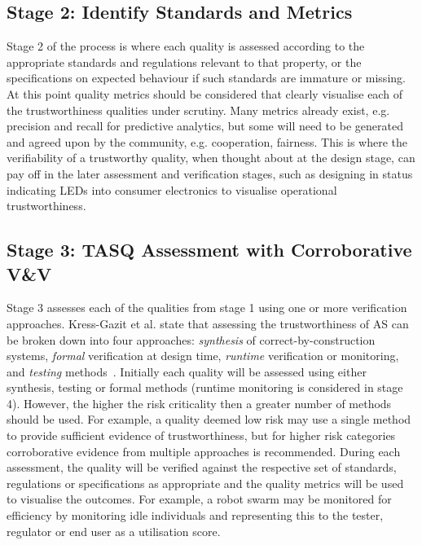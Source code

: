 \subsection{Stage 2: Identify Standards and Metrics}

Stage 2 of the process is where each quality is assessed according to the appropriate standards and regulations relevant to that property, or the specifications on expected behaviour if such standards are immature or missing. 
%
At this point quality metrics should be considered that clearly visualise each of the trustworthiness qualities under scrutiny. 
%
Many metrics already exist, e.g. precision and recall for predictive analytics, but some will need to be generated and agreed upon by the community, e.g. cooperation, fairness. 
%
This is where the verifiability of a trustworthy quality, when thought about at the design stage, can pay off in the later assessment and verification stages, such as designing in status indicating LEDs into consumer electronics to visualise operational trustworthiness. 


\subsection{Stage 3: TASQ Assessment with Corroborative V\&V}

Stage 3 assesses each of the qualities from stage 1 using one or more verification approaches. 
%
Kress-Gazit et al. state that assessing the trustworthiness of AS can be broken down into four approaches: \emph{synthesis} of correct-by-construction systems, \emph{formal} verification at design time, \emph{runtime} verification or monitoring, and \emph{testing} methods~\cite{kress2021formalizing}. 
%
Initially each quality will be assessed using either synthesis, testing or formal methods (runtime monitoring is considered in stage 4). However, the higher the risk criticality then a greater number of methods should be used. For example, a quality deemed low risk may use a single method to provide sufficient evidence of trustworthiness, but for higher risk categories corroborative evidence from multiple approaches is recommended. 
%
During each assessment, the quality will be verified against the respective set of standards, regulations or specifications as appropriate and the quality metrics will be used to visualise the outcomes. 
%
For example, a robot swarm may be monitored for efficiency by monitoring idle individuals and representing this to the tester, regulator or end user as a utilisation score. 


